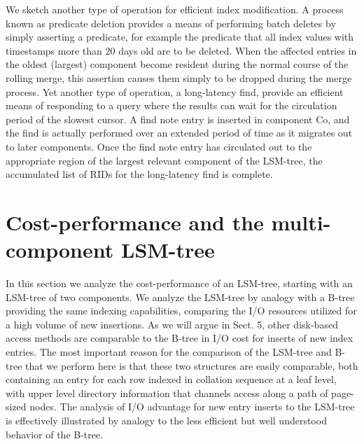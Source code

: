 \documentclass[a4paper,12pt,notitlepage,twoside,openright]{article}
\begin{document}
We sketch another type of operation for efficient index modification. A
process known as predicate deletion provides a means of performing batch
deletes by simply asserting a predicate, for example the predicate that
all index values with timestamps more than 20 days old are to be
deleted. When the affected entries in the oldest (largest) component
become resident during the normal course of the rolling merge, this
assertion causes them simply to be dropped during the merge process. Yet
another type of operation, a long-latency find, provide an efficient
means of responding to a query where the results can wait for the
circulation period of the slowest cursor. A find note entry is inserted
in component Co, and the find is actually performed over an extended
period of time as it migrates out to later components. Once the find
note entry has circulated out to the appropriate region of the largest
relevant component of the LSM-tree, the accumulated list of RIDs for the
long-latency find is complete.


\hypertarget{cost-performance-and-the-multi-component-lsm-tree}{%
\section{Cost-performance and the multi-component
LSM-tree}\label{cost-performance-and-the-multi-component-lsm-tree}}


In this section we analyze the cost-performance of an LSM-tree, starting
with an LSM-tree of two components. We analyze the LSM-tree by analogy
with a B-tree providing the same indexing capabilities, comparing the
I/O resources utilized for a high volume of new insertions. As we will
argue in Sect. 5, other disk-based access methods are comparable to the
B-tree in I/O cost for inserts of new index entries. The most important
reason for the comparison of the LSM-tree and B-tree that we perform
here is that these two structures are easily comparable, both containing
an entry for each row indexed in collation sequence at a leaf level,
with upper level directory information that channels access along a path
of page-sized nodes. The analysis of I/O advantage for new entry inserts
to the LSM-tree is effectively illustrated by analogy to the less
efficient but well understood behavior of the B-tree.
\end{document}
